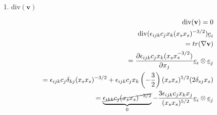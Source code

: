 \begin{enumerate}
\begin{enumerate}
\begin{proof}
\begin{align}
                    =\nabla(c_{i}(x_{k}x_{k})^{-3/2})-\nabla(3c_{j}x_{j}x_{i}(x_{k}x_{k})^{-5/2}) \\
                    \frac{ \partial c_{i}(x_{k}x_{k})^{-3/2} }{ \partial x_{j} } -\frac{ \partial (3c_{j}x_{j}x_{i}(x_{k}x_{k})^{-5/2}) }{ \partial x_{j} } 
                    \end{align}
Simplifying further:
\begin{align}
=-\frac{3}{2}c_{i}(x_{k}x_{k})^{-5/2}(2\delta_{kj}x_{k})-3c_{j}(3)x_{i}(x_{k}x_{k})^{-5/2} \\
=-3c_{i}(x_{k}x_{k})^{-5/2}x_{j}=\frac{9c_{j}x_{i}}{(x_{k}x_{k})^{5/2}}+\frac{3c_{j}x_{i}}{(x_{k}x_{k})^{5/2}} \\
-\frac{3c_{i}x_{j}}{(x_{k}x_{k})^{5/2}}=3c_{j}x_{j}x_{i}\left( -\frac{5}{2} \right)(x_{k}x_{k})^{-7/2}(2\delta_{kj}x_{k}) \\
=-3c_{i}x_{j} \\
(x_{k}x_{k})^{5/2}=-\frac{15c_{j}(x_{j}x_{j})x_{i}}{(x_{k}x_{k})^{7/2}} \\
=\frac{-3c_{i}x_{j}}{(x_{k}x_{k})^{5/2}}+\frac{3c_{j}x_{i}}{(x_{k}x_{k})^{5/2}}
\end{align}

The index $i=j$ when applying the trace function upon a tensor, so the following holds true:

\begin{align}
\text{tr}\left( \frac{-3c_{i}x_{j}}{(x_{k}x_{k})^{5/2}}+\frac{3c_{j}x_{i}}{(x_{k}x_{k})^{5/2}} \right) \\
=0
\end{align}
            \end{proof}
            \pagebreak
            \item $\text{div}(\mathbf{v})$
            
\begin{align}
\text{div}(\mathbf{v})=0 \\
\text{div}(\epsilon_{ijk}c_{j}x_{k}(x_{s}x_{s})^{-3/2})\underline{e}_{i} \\
=tr(\nabla \mathbf{v}) \\
=\frac{ \partial \epsilon_{ijk}c_{j}x_{k}(x_{s}x_{s}^{-3/2}) }{ \partial x_{j} } \underline{e}_{i}\otimes \underline{e}_{j} \\
=\epsilon_{ijk}c_{j}\delta_{kj}(x_{s}x_{s})^{-3/2}+\epsilon_{ijk}c_{j}x_{k}\left( -\frac{3}{2} \right)(x_{s}x_{s})^{5/2}(2\delta_{sj}x_{s}) \\
=\underbrace{ \cancel{ \epsilon_{ikk}c_{j}(x_{s}x_{s})^{-3/2} } }_{ 0 }-\frac{3\epsilon_{ijk}c_{j}x_{k}x_{j}}{(x_{s}x_{s})^{5/2}}\underline{e}_{i}\otimes \underline{e}_{j} \label{eq:101}
\end{align}


\end{enumerate}
\end{enumerate}
